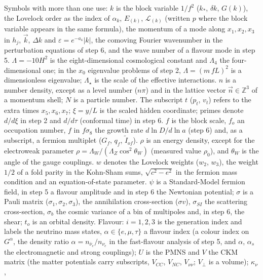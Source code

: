 \documentclass[
  10pt,
]{article}
\begin{document}
Symbols with more than one use: \(k\) is the block variable \(1/f^2\)
(\(k_*\), \(\delta k\), \(G(k)\)), the Lovelock order as the index of
\(\alpha_k\), \(E_{(k)}\), \(\mathcal L_{(k)}\) (written \(p\) where the
block variable appears in the same formula), the momentum of a mode
along \(x_1, x_2, x_3\) in \(h_j\), \(\vec k\), \(\Delta k\) and
\(\varepsilon = e^{-a_4}\lvert k\rvert\), the comoving Fourier
wavenumber in the perturbation equations of step 6, and the wave number
of a flavour mode in step 5. \(\Lambda = -10H^2\) is the
eight-dimensional cosmological constant and \(\Lambda_4\) the
four-dimensional one; in the \(x_0\) eigenvalue problems of step 2,
\(\Lambda = (m\,fL)^2\) is a dimensionless eigenvalue; \(\Lambda_\star\)
is the scale of the effective interactions. \(n\) is a number density,
except as a level number (\(n\pi\)) and in the lattice vector
\(\vec n \in \mathbb Z^3\) of a momentum shell; \(N\) is a particle
number. The subscript \(t\) (\(p_t\), \(v_t\)) refers to the extra times
\(x_5, x_6, x_7\); \(\xi = y/L\) is the scaled hidden coordinate; primes
denote \(d/d\xi\) in step 2 and \(d/d\tau\) (conformal time) in step 6.
\(f\) is the block scale, \(f_o\) an occupation number, \(f\) in
\(f\sigma_8\) the growth rate \(d\ln D/d\ln a\) (step 6) and, as a
subscript, a fermion multiplet (\(G_f\), \(q_f\), \(\tilde I_{of}\)).
\(\rho\) is an energy density, except for the electroweak parameter
\(\rho = \Lambda_W/(\Lambda_Z\cos^2\theta_W)\) (measured value
\(\rho_0\)), and \(\theta_W\) is the angle of the gauge couplings. \(w\)
denotes the Lovelock weights (\(w_2\), \(w_3\)), the weight \(1/2\) of a
fold parity in the Kohn-Sham sums, \(\sqrt{c^2 - e^2}\) in the fermion
mass condition and an equation-of-state parameter. \(\psi\) is a
Standard-Model fermion field, in step 5 a flavour amplitude and in step
6 the Newtonian potential; \(\sigma\) is a Pauli matrix
(\(\sigma_1, \sigma_2, \sigma_3\)), the annihilation cross-section
(\(\sigma v\)), \(\sigma_{SI}\) the scattering cross-section,
\(\sigma_b\) the cosmic variance of a bin of multipoles and, in step 6,
the shear; \(t_o\) is an orbital density. Flavour: \(i = 1, 2, 3\) is
the generation index and labels the neutrino mass states,
\(\alpha \in \{e, \mu, \tau\}\) a flavour index (a colour index on
\(G^\alpha\), the density ratio \(\alpha = n_{\bar\nu_e}/n_{\nu_e}\) in
the fast-flavour analysis of step 5, and \(\alpha\), \(\alpha_s\) the
electromagnetic and strong couplings); \(U\) is the PMNS and \(V\) the
CKM matrix (the matter potentials carry subscripts, \(V_{CC}\),
\(V_{NC}\), \(V_{\nu\nu}\); \(V_\perp\) is a volume); \(\kappa_\nu\),
\end{document}
